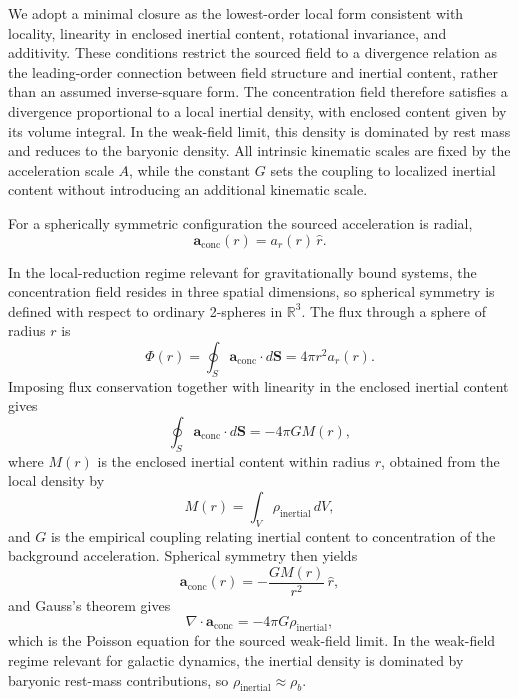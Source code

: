 \documentclass[fontsize=12pt, paper=a4]{scrartcl}
\begin{document}
We adopt a minimal closure as the lowest-order local form consistent with locality, linearity in enclosed inertial content, rotational invariance, and additivity. These conditions restrict the sourced field to a divergence relation as the leading-order connection between field structure and inertial content, rather than an assumed inverse-square form. The concentration field therefore satisfies a divergence proportional to a local inertial density, with enclosed content given by its volume integral. In the weak-field limit, this density is dominated by rest mass and reduces to the baryonic density. All intrinsic kinematic scales are fixed by the acceleration scale $A$, while the constant $G$ sets the coupling to localized inertial content without introducing an additional kinematic scale.

For a spherically symmetric configuration the sourced acceleration is radial,
\begin{equation}
\mathbf a_{\mathrm{conc}}(r)=a_r(r)\,\hat r.
\end{equation}

In the local-reduction regime relevant for gravitationally bound systems, the concentration field resides in three spatial dimensions, so spherical symmetry is defined with respect to ordinary 2-spheres in $\mathbb{R}^3$. The flux through a sphere of radius $r$ is
\begin{equation}
\Phi(r)=\oint_S \mathbf a_{\mathrm{conc}}\cdot d\mathbf S
=4\pi r^2 a_r(r).
\end{equation}
Imposing flux conservation together with linearity in the enclosed inertial content gives
\begin{equation}
\oint_S \mathbf a_{\mathrm{conc}}\cdot d\mathbf S = -4\pi G M(r),
\label{eq:aft_flux_integral}
\end{equation}
where $M(r)$ is the enclosed inertial content within radius $r$, obtained from the local density by
\begin{equation}
M(r)=\int_V \rho_{\mathrm{inertial}}\,dV,
\end{equation}
and $G$ is the empirical coupling relating inertial content to concentration of the background acceleration. Spherical symmetry then yields
\begin{equation}
\mathbf a_{\mathrm{conc}}(r)=-\frac{G M(r)}{r^2}\,\hat r,
\label{eq:aft_inverse_square}
\end{equation}
and Gauss's theorem gives
\begin{equation}
\nabla\!\cdot \mathbf{a}_{\mathrm{conc}} = -4\pi G \rho_{\mathrm{inertial}},
\label{eq:aft_gauss_law}
\end{equation}
which is the Poisson equation for the sourced weak-field limit. In the weak-field regime relevant for galactic dynamics, the inertial density is dominated by baryonic rest-mass contributions, so $\rho_{\mathrm{inertial}}\approx\rho_b$.
\end{document}
